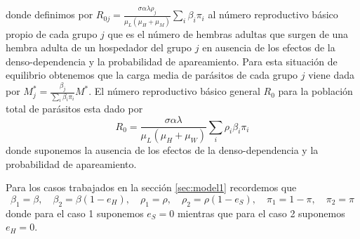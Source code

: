 \documentclass[12pt,a4paper]{article}
\theoremstyle{plain}%
\theoremstyle{definition}
\theoremstyle{remark}
\begin{document}
%	
	donde definimos por $R_{0j}=\frac{ \sigma \alpha \lambda \rho_j}{\mu_L(\mu_{H}+\mu_M)} \sum_i \beta_i \pi_i $ al número reproductivo básico propio de cada grupo $j$ que es el número de hembras adultas que surgen 
	de una hembra adulta de un hospedador del grupo $j$ en ausencia de los efectos de la denso-dependencia y la probabilidad de apareamiento. 
	Para esta situación de equilibrio obtenemos que la carga media de parásitos de cada grupo $j$ viene dada por $M_j^*=\frac{\beta_j}{\sum_i \beta_i \pi_i}M^*$.
	El número reproductivo básico general $R_0$ para la población total de parásitos esta dado por %
	\begin{equation}\label{valorR0}
	R_{0}=\frac{\sigma \alpha \lambda}{\mu_L (\mu_{H} + \mu_W) }\sum_i \rho_i \beta_i  \pi_i 
	\end{equation}
	donde suponemos la ausencia de los efectos de la denso-dependencia y la probabilidad de apareamiento.
	
	Para los casos trabajados en la sección \ref{sec:model1} recordemos que
	\begin{equation*}
	\beta_1=\beta,\quad \beta_2=\beta(1-e_{H}),\quad \rho_1=\rho,\quad \rho_2=\rho(1-e_{S}),\quad \pi_1=1-\pi, \quad \pi_2=\pi 
	\end{equation*}
	donde para el caso 1 suponemos $e_{S}=0$ mientras que para el caso 2 suponemos $e_{H}=0$. 	 
	 
\end{document}
